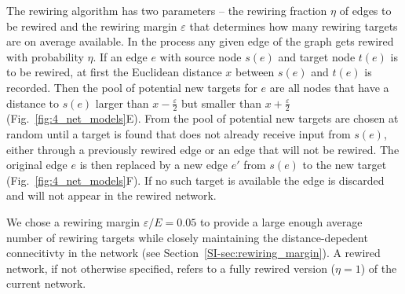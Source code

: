 The rewiring algorithm has two parameters -- the rewiring fraction
$\eta$ of edges to be rewired and the rewiring margin $\varepsilon$ that
determines how many rewiring targets are on average available. In the
process any given edge of the graph gets rewired with probability
$\eta$. If an edge $e$ with source node $s(e)$ and target node $t(e)$
is to be rewired, at first the Euclidean distance $x$ between $s(e)$
and $t(e)$ is recorded. Then the pool of potential new targets for $e$
are all nodes that have a distance to $s(e)$ larger than
$x-\frac{\varepsilon}{2}$ but smaller than $x+\frac{\varepsilon}{2}$
(Fig.~\ref{fig:4_net_models}E). From the pool of potential new targets
are chosen at random until a target is found that does not already
receive input from $s(e)$, either through a previously rewired edge or
an edge that will not be rewired. The original edge $e$ is then
replaced by a new edge $e'$ from $s(e)$ to the new target
(Fig.~\ref{fig:4_net_models}F). If no such target is available the
edge is discarded and will not appear in the rewired network.

We chose a rewiring margin $\varepsilon / E = 0.05$ to provide a large
enough average number of rewiring targets while closely maintaining
the distance-depedent connecitivty in the network (see
Section~\ref{SI-sec:rewiring_margin}). A rewired network, if not
otherwise specified, refers to a fully rewired version ($\eta=1$) of
the current network.












